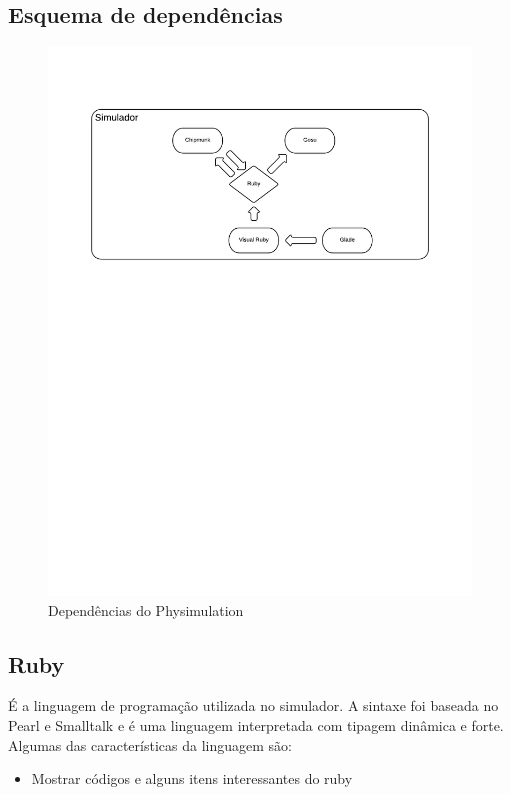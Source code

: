 \subsection{Esquema de dependências}

\begin{figure}[H]
	\centering
	\includegraphics[scale=0.45]{images/esquema-dependencias.png}
	\caption{Dependências do Physimulation}
\end{figure}

\subsection{Ruby}
É a linguagem de programação utilizada no simulador. A sintaxe foi baseada no Pearl e Smalltalk e é uma linguagem interpretada com tipagem dinâmica e forte. \\ 

Algumas das características da linguagem são:
\begin{itemize}
  \item Mostrar códigos e alguns itens interessantes do ruby
\end{itemize}

